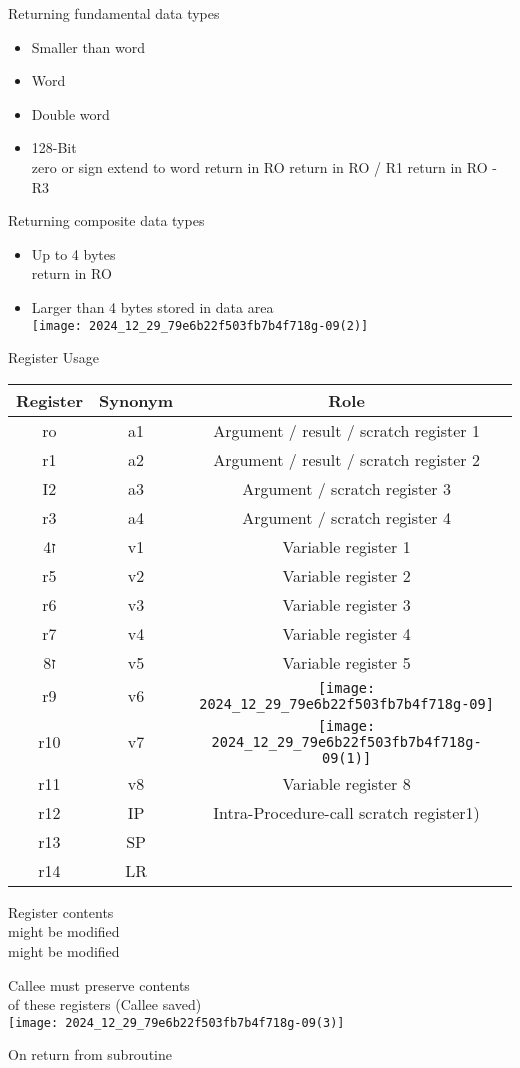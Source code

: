 Returning fundamental data types

\begin{itemize}
  \item Smaller than word
  \item Word
  \item Double word
  \item 128-Bit\\
zero or sign extend to word return in RO return in RO / R1 return in RO - R3
\end{itemize}

Returning composite data types

\begin{itemize}
  \item Up to 4 bytes\\
return in RO
  \item Larger than 4 bytes stored in data area\\
\texttt{[image: 2024\_12\_29\_79e6b22f503fb7b4f718g-09(2)]}
\end{itemize}

Register Usage

\begin{center}
\begin{tabular}{|c|c|c|}
\hline
Register & Synonym & Role \\
\hline
ro & a1 & Argument / result / scratch register 1 \\
\hline
r1 & a2 & Argument / result / scratch register 2 \\
\hline
I2 & a3 & Argument / scratch register 3 \\
\hline
r3 & a4 & Argument / scratch register 4 \\
\hline
ז4 & v1 & Variable register 1 \\
\hline
r5 & v2 & Variable register 2 \\
\hline
r6 & v3 & Variable register 3 \\
\hline
r7 & v4 & Variable register 4 \\
\hline
ז8 & v5 & Variable register 5 \\
\hline
r9 & v6 & \texttt{[image: 2024\_12\_29\_79e6b22f503fb7b4f718g-09]}
 \\
\hline
r10 & v7 & \texttt{[image: 2024\_12\_29\_79e6b22f503fb7b4f718g-09(1)]}
 \\
\hline
r11 & v8 & Variable register 8 \\
\hline
r12 & IP & Intra-Procedure-call scratch register1) \\
\hline
r13 & SP &  \\
\hline
r14 & LR &  \\
\hline
\end{tabular}
\end{center}

Register contents\\
might be modified\\
might be modified

Callee must preserve contents\\
of these registers (Callee saved)\\
\texttt{[image: 2024\_12\_29\_79e6b22f503fb7b4f718g-09(3)]}

On return from subroutine